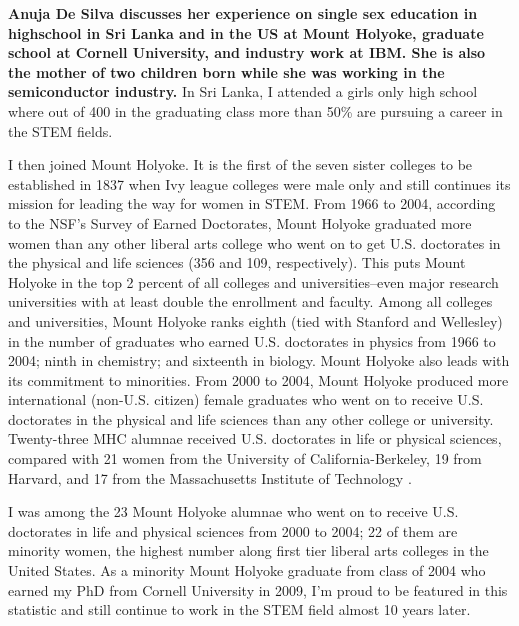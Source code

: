 \documentclass[utf8]{frontiersSCNS} %
\begin{document}
{\bf 
Anuja De Silva discusses her experience on single sex education in highschool in Sri Lanka and in the US at Mount Holyoke, graduate school at Cornell University, and industry work at IBM. She is also the mother of two children born while she was working in the semiconductor industry.}
In Sri Lanka, I attended a girls only high school where out of 400 in the graduating class more than 50\% are pursuing a career in the STEM fields.  

I then joined Mount Holyoke. It is the first of the seven sister colleges to be established in 1837 when Ivy league colleges were male only and still continues its mission for leading the way for women in STEM. From 1966 to 2004, according to the NSF’s Survey of Earned Doctorates, Mount Holyoke graduated more women than any other liberal arts college who went on to get U.S. doctorates in the physical and life sciences (356 and 109, respectively). This puts Mount Holyoke in the top 2 percent of all colleges and universities--even major research universities with at least double the enrollment and faculty. Among all colleges and universities, Mount Holyoke ranks eighth (tied with Stanford and Wellesley) in the number of graduates who earned U.S. doctorates in physics from 1966 to 2004; ninth in chemistry; and sixteenth in biology.  Mount Holyoke also leads with its commitment to minorities. From 2000 to 2004, Mount Holyoke produced more international (non-U.S. citizen) female graduates who went on to receive U.S. doctorates in the physical and life sciences than any other college or university. Twenty-three MHC alumnae received U.S. doctorates in life or physical sciences, compared with 21 women from the University of California-Berkeley, 19 from Harvard, and 17 from the Massachusetts Institute of Technology \citep{MHC}.  

I was among the 23  Mount Holyoke alumnae who went on to receive U.S. doctorates in life and physical sciences from 2000 to 2004; 22 of them are minority women, the highest number along first tier liberal arts colleges in the United States. As a minority Mount Holyoke graduate from class of 2004 who earned my PhD from Cornell University in 2009, I’m proud to be featured in this statistic and still continue to work in the STEM field almost 10 years later.
\end{document}

